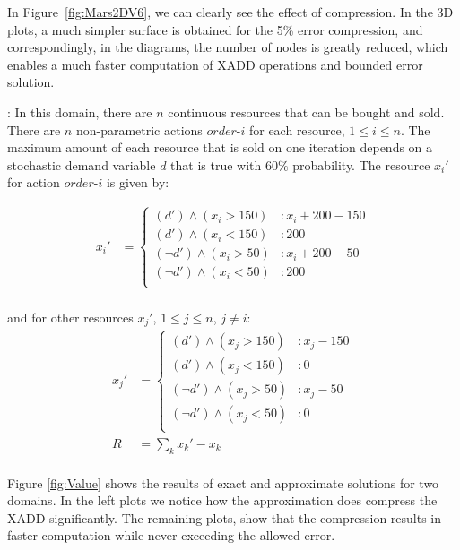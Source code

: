 In Figure~\ref{fig:Mars2DV6}, we can clearly see the effect of compression. In the 3D plots, a much simpler surface is obtained for the 5\% error compression, and correspondingly, in the diagrams, the number of nodes is greatly reduced, which enables a much faster computation of XADD operations and bounded error solution. 

\Invent:
In this domain, there are $n$ continuous resources that can be bought and sold. There are $n$ non-parametric actions $order$-$i$ for each resource, $ 1 \leq i \leq n$. The maximum amount of  each resource that is sold on one iteration depends on a stochastic demand variable $d$ that is true with $60\%$ probability. The resource $x_i'$ for action $order$-$i$ is given by:

\vspace{-8mm}
{\footnotesize
\begin{align*}
x_i' & = \begin{cases} 
(d') \wedge (x_i > 150) &: x_i + 200 - 150\\
(d') \wedge (x_i < 150) &:  200\\
(\neg d') \wedge (x_i > 50) &: x_i + 200 - 50\\
(\neg d') \wedge (x_i < 50) &:  200\\
\end{cases} \\
\end{align*} }
\vspace{-14mm}

and for other resources $x_j'$, $1 \leq j \leq n$, $j\neq i$:\\

\vspace{-10mm}
{\footnotesize
\begin{align*}
x_j' & = \begin{cases} 
(d') \wedge (x_j > 150) &: x_j - 150\\
(d') \wedge (x_j < 150) &:  0\\
(\neg d') \wedge (x_j > 50) &: x_j - 50\\
(\neg d') \wedge (x_j < 50) &:  0\\
\end{cases} \\
R & = \sum_{k} {x_k' - x_k}\\
\end{align*} }
\vspace{-6mm}

Figure \ref{fig:Value} shows the results of exact and approximate
solutions for two domains. In the left plots we notice how the
approximation does compress the XADD significantly. The remaining
plots, show that the compression results in faster computation while
never exceeding the allowed error.
